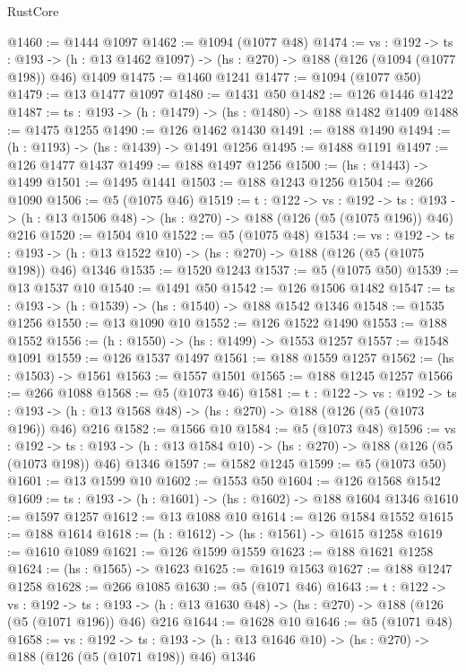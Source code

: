\begin{lexlean}{RustCore}
\begin{coremodule}
@1460 := @1444 @1097
@1462 := @1094 (@1077 @48)
@1474 := {vs : @192} ->
  {ts : @193} -> (h : @13 @1462 @1097) -> (hs : @270) -> @188 (@126 (@1094 (@1077 @198)) @46) @1409
@1475 := @1460 @1241
@1477 := @1094 (@1077 @50)
@1479 := @13 @1477 @1097
@1480 := @1431 @50
@1482 := @126 @1446 @1422
@1487 := {ts : @193} -> (h : @1479) -> (hs : @1480) -> @188 @1482 @1409
@1488 := @1475 @1255
@1490 := @126 @1462 @1430
@1491 := @188 @1490
@1494 := (h : @1193) -> (hs : @1439) -> @1491 @1256
@1495 := @1488 @1191
@1497 := @126 @1477 @1437
@1499 := @188 @1497 @1256
@1500 := (hs : @1443) -> @1499
@1501 := @1495 @1441
@1503 := @188 @1243 @1256
@1504 := @266 @1090
@1506 := @5 (@1075 @46)
@1519 := {t : @122} ->
  {vs : @192} ->
  {ts : @193} -> (h : @13 @1506 @48) -> (hs : @270) -> @188 (@126 (@5 (@1075 @196)) @46) @216
@1520 := @1504 @10
@1522 := @5 (@1075 @48)
@1534 := {vs : @192} ->
  {ts : @193} -> (h : @13 @1522 @10) -> (hs : @270) -> @188 (@126 (@5 (@1075 @198)) @46) @1346
@1535 := @1520 @1243
@1537 := @5 (@1075 @50)
@1539 := @13 @1537 @10
@1540 := @1491 @50
@1542 := @126 @1506 @1482
@1547 := {ts : @193} -> (h : @1539) -> (hs : @1540) -> @188 @1542 @1346
@1548 := @1535 @1256
@1550 := @13 @1090 @10
@1552 := @126 @1522 @1490
@1553 := @188 @1552
@1556 := (h : @1550) -> (hs : @1499) -> @1553 @1257
@1557 := @1548 @1091
@1559 := @126 @1537 @1497
@1561 := @188 @1559 @1257
@1562 := (hs : @1503) -> @1561
@1563 := @1557 @1501
@1565 := @188 @1245 @1257
@1566 := @266 @1088
@1568 := @5 (@1073 @46)
@1581 := {t : @122} ->
  {vs : @192} ->
  {ts : @193} -> (h : @13 @1568 @48) -> (hs : @270) -> @188 (@126 (@5 (@1073 @196)) @46) @216
@1582 := @1566 @10
@1584 := @5 (@1073 @48)
@1596 := {vs : @192} ->
  {ts : @193} -> (h : @13 @1584 @10) -> (hs : @270) -> @188 (@126 (@5 (@1073 @198)) @46) @1346
@1597 := @1582 @1245
@1599 := @5 (@1073 @50)
@1601 := @13 @1599 @10
@1602 := @1553 @50
@1604 := @126 @1568 @1542
@1609 := {ts : @193} -> (h : @1601) -> (hs : @1602) -> @188 @1604 @1346
@1610 := @1597 @1257
@1612 := @13 @1088 @10
@1614 := @126 @1584 @1552
@1615 := @188 @1614
@1618 := (h : @1612) -> (hs : @1561) -> @1615 @1258
@1619 := @1610 @1089
@1621 := @126 @1599 @1559
@1623 := @188 @1621 @1258
@1624 := (hs : @1565) -> @1623
@1625 := @1619 @1563
@1627 := @188 @1247 @1258
@1628 := @266 @1085
@1630 := @5 (@1071 @46)
@1643 := {t : @122} ->
  {vs : @192} ->
  {ts : @193} -> (h : @13 @1630 @48) -> (hs : @270) -> @188 (@126 (@5 (@1071 @196)) @46) @216
@1644 := @1628 @10
@1646 := @5 (@1071 @48)
@1658 := {vs : @192} ->
  {ts : @193} -> (h : @13 @1646 @10) -> (hs : @270) -> @188 (@126 (@5 (@1071 @198)) @46) @1346

\end{coremodule}
\end{lexlean}
